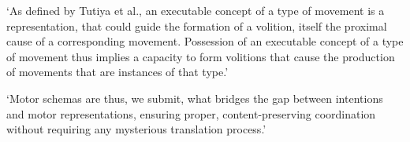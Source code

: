 \documentclass[12pt]{extarticle}
\begin{document}
\begin{multicols*}{3}
‘As defined by Tutiya et al., an executable concept of a type of movement is a
representation, that could guide the formation of a volition, itself the proximal cause of
a corresponding movement. Possession of an executable concept of a type of movement thus
implies a capacity to form volitions that cause the production of movements that are
instances of that type.’
\citep[p.~7]{pacherie:2011_nonconceptual}

‘Motor schemas are thus, we submit, what bridges the gap between intentions and motor representations, ensuring proper, content-preserving coordination without requiring any mysterious translation process.’


    




\footnotesize


\end{multicols*}
\end{document}
